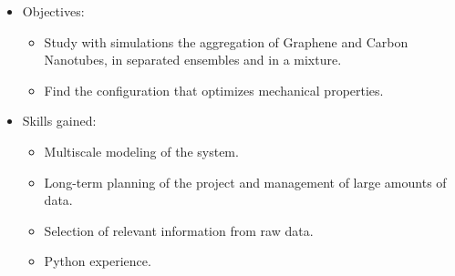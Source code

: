 \documentclass[10pt,a4paper,normalphoto,ragged2e]{altacv}
\begin{document}
\begin{itemize}
    \item Objectives:
    \begin{itemize}[label=\textendash]
        \item Study with simulations the aggregation of Graphene and Carbon Nanotubes, in separated ensembles and in a mixture.
        \item Find the configuration that optimizes mechanical properties.
    \end{itemize}
    \item Skills gained:
        \begin{itemize}[label=\textendash]
            \item Multiscale modeling of the system.
            \item Long-term planning of the project and management of large amounts of data.
            \item Selection of relevant information from raw data.
            \item Python experience.
        \end{itemize}
\end{itemize}
\vspace{-3mm}
\divider
\end{document}

